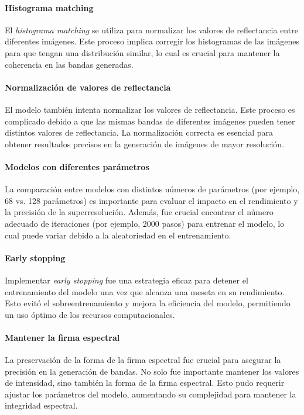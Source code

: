                 \paragraph{Histograma matching}
                    El \textit{histograma matching} se utiliza para normalizar los valores de reflectancia entre diferentes imágenes. Este proceso implica corregir los histogramas de las imágenes para que tengan una distribución similar, lo cual es crucial para mantener la coherencia en las bandas generadas.

                \paragraph{Normalización de valores de reflectancia}
                    El modelo también intenta normalizar los valores de reflectancia. Este proceso es complicado debido a que las mismas bandas de diferentes imágenes pueden tener distintos valores de reflectancia. La normalización correcta es esencial para obtener resultados precisos en la generación de imágenes de mayor resolución.

                \paragraph{Modelos con diferentes parámetros}
                    La comparación entre modelos con distintos números de parámetros (por ejemplo, 68 vs. 128 parámetros) es importante para evaluar el impacto en el rendimiento y la precisión de la superresolución. Además, fue crucial encontrar el número adecuado de iteraciones (por ejemplo, 2000 pasos) para entrenar el modelo, lo cual puede variar debido a la aleatoriedad en el entrenamiento.

                \paragraph{Early stopping}
                    Implementar \textit{early stopping} fue una estrategia eficaz para detener el entrenamiento del modelo una vez que alcanza una meseta en su rendimiento. Esto evitó el sobreentrenamiento y mejora la eficiencia del modelo, permitiendo un uso óptimo de los recursos computacionales.

                \paragraph{Mantener la firma espectral}
                    La preservación de la forma de la firma espectral fue crucial para asegurar la precisión en la generación de bandas. No solo fue importante mantener los valores de intensidad, sino también la forma de la firma espectral. Esto pudo requerir ajustar los parámetros del modelo, aumentando su complejidad para mantener la integridad espectral.


